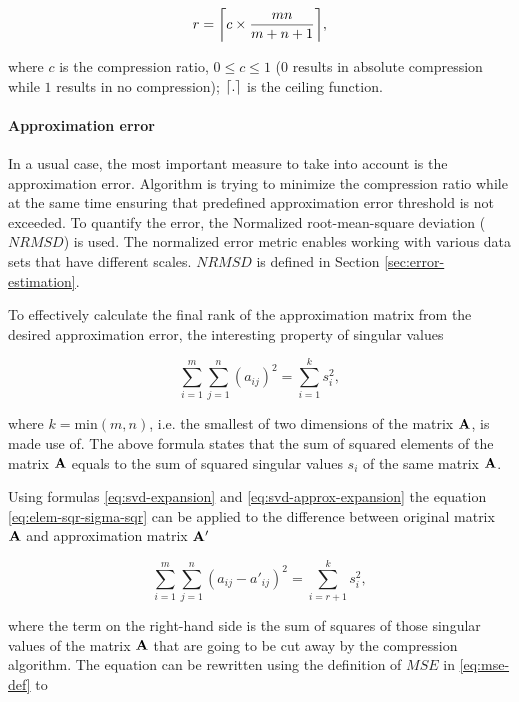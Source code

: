 \begin{equation}
r=\ceil*{c \times \frac{m n}{m+n+1}},
\label{eq:rank-from-comp-ratio}
\end{equation}

\noindent
where $c$ is the compression ratio, $0 \leq c \leq 1$ ($0$ results in absolute compression while $1$ results in no compression); $\ceil*{.}$ is the ceiling function.

\paragraph{Approximation error}
In a usual case, the most important measure to take into account is the approximation error. Algorithm is trying to minimize the compression ratio while at the same time ensuring that predefined approximation error threshold is not exceeded. To quantify the error, the Normalized root-mean-square deviation ($\mathit{NRMSD}$) is used. The normalized error metric enables working with various data sets that have different scales. $\mathit{NRMSD}$ is defined in Section \ref{sec:error-estimation}.

To effectively calculate the final rank of the approximation matrix from the desired approximation error, the interesting property of singular values

\begin{equation}
\sum_{i=1}^{m} \sum_{j=1}^{n} (a_{ij})^{2} = \sum_{i=1}^{k}{s_{i}^{2}},
\label{eq:elem-sqr-sigma-sqr}
\end{equation}

\noindent
where $k=\mathrm{min}(m, n)$, i.e. the smallest of two dimensions of the matrix $\mtrx{A}$, is made use of. The above formula states that the sum of squared elements of the matrix $\mtrx{A}$ equals to the sum of squared singular values $s_{i}$ of the same matrix $\mtrx{A}$.

Using formulas \eqref{eq:svd-expansion} and \eqref{eq:svd-approx-expansion} the equation \eqref{eq:elem-sqr-sigma-sqr} can be applied to the difference between original matrix $\mtrx{A}$ and approximation matrix $\mtrx{A'}$

\begin{equation}
\sum_{i=1}^{m} \sum_{j=1}^{n} (a_{ij} - a'_{ij})^{2} = \sum_{i=r+1}^{k}{s_{i}^{2}},
\end{equation}

\noindent
where the term on the right-hand side is the sum of squares of those singular values of the matrix $\mtrx{A}$ that are going to be cut away by the compression algorithm. The equation can be rewritten using the definition of $\mathit{MSE}$ in \eqref{eq:mse-def} to

